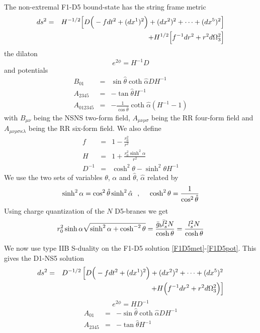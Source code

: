 \documentclass[a4paper,twoside,titlepage,12pt]{article}
\begin{document}
The non-extremal F1-D5 bound-state has the string frame 
metric \cite{Lu:1999uc,Harmark:2000wv}
%
\begin{eqnarray}
\label{F1D5met}
ds^2 &=& H^{-1/2} \Big[ D \Big( - f dt^2 + (dx^1)^2 \Big)
+  (dx^2)^2 + \cdots + (dx^5)^2 \Big]
\nonumber \\ && + H^{1/2} \Big[ f^{-1} dr^2 + r^2 d\Omega_3^2 \Big]
\end{eqnarray}
%
the dilaton
%
\begin{equation}
\label{F1D5dil}
e^{2\phi} = H^{-1} D
\end{equation}
%
and potentials
%
\begin{eqnarray}
\label{F1D5pot}
B_{01} &=& \sin \hat{\theta} \coth \hat{\alpha} D H^{-1} 
\\
A_{2345} &=& - \tan \hat{\theta} H^{-1}
\\
A_{012345} &=& - \frac{1}{\cos \hat{\theta}} \coth \hat{\alpha} (H^{-1}-1)
\end{eqnarray}
%
with $B_{\mu \nu}$ being the NSNS two-form field, 
$A_{\mu \nu \rho \sigma}$ being the RR four-form field
and $A_{\mu \nu \rho \sigma \kappa \lambda}$ being the RR six-form field.
We also define
%
\begin{eqnarray}
\label{F1D5defs}
f &=& 1 - \frac{r_0^2}{r^2}
\\
H &=& 1 + \frac{r_0^2 \sinh^2 \alpha}{r^2} 
\\
D^{-1} &=& \cosh^2 \theta - \sinh^2 \theta H^{-1}
\end{eqnarray}
%
We use the two sets of variables $\theta$, $\alpha$ and $\hat{\theta}$,
$\hat{\alpha}$ related by
%
\begin{equation}
\label{newvar}
\sinh^2 \alpha = \cos^2 \hat{\theta} \sinh^2 \hat{\alpha} \ \ ,\ \ \ \ 
\cosh^2 \theta = \frac{1}{\cos^2 \hat{\theta}}
\end{equation}
%
Using charge quantization of the $N$ D5-branes we get
%
\begin{equation}
r_0^2 \sinh{\alpha} \sqrt{ \sinh^2 \alpha + \cosh^{-2} \theta }
= \frac{\bar{g}_b \bar{l}_s^2 N}{\cosh \theta}
= \frac{l_s^2 N}{\cosh \theta}
\end{equation}


We now use type IIB S-duality on the F1-D5 solution 
\eqref{F1D5met}-\eqref{F1D5pot}.
This gives the D1-NS5 solution
%
\begin{eqnarray}
\label{D1NS5met}
ds^2 &=& D^{-1/2} \left[ D \Big( - f dt^2 + (dx^1)^2 \Big)
+ (dx^2)^2 + \cdots + (dx^5)^2 
\right. \nonumber \\ && \left.
+ H \Big( f^{-1} dr^2 + r^2 d\Omega_3^2 \Big) \right]
\end{eqnarray}
%
\begin{equation}
\label{D1NS5dil}
e^{2\phi} = H D^{-1}
\end{equation}
%
\begin{eqnarray}
\label{D1NS5pot}
A_{01} &=& - \sin \hat{\theta} \coth \hat{\alpha} D H^{-1} 
\\
A_{2345} &=& - \tan \hat{\theta} H^{-1}
\end{eqnarray}
\end{document}
